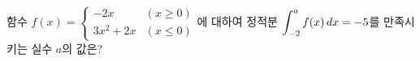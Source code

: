 함수 $f(x)=\begin{cases} -2x & (x\ge 0) \\ 3x^2+2x & (x\le 0) \end{cases}$에 대하여 정적분 $\displaystyle\int_{-2}^{a} f(x)\mkern3mu dx=-5$를 만족시키는 실수 $a$의 값은? 
